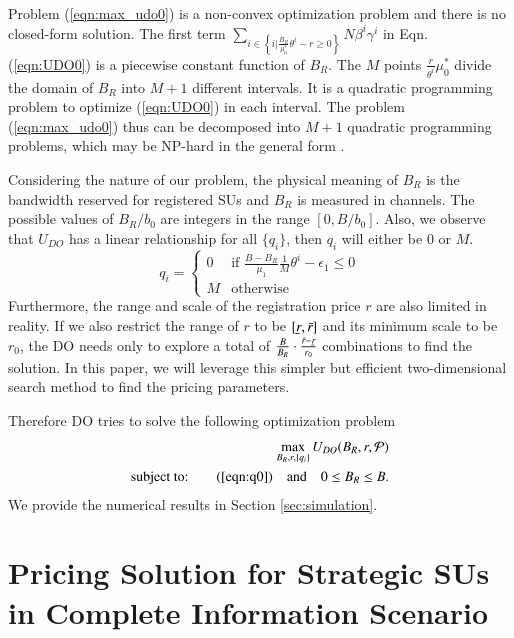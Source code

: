 \documentclass[journal]{IEEEtran}
\begin{document}
Problem (\ref{eqn:max_udo0}) is a non-convex optimization problem and there is no closed-form solution.
The first term $\sum_{i\in\left\{i|\frac{B_R}{\mu_0^*}\theta^i-r\geq 0\right\}}N\beta^i\gamma^i$ in Eqn. (\ref{eqn:UDO0}) is a piecewise constant function of $B_R$. The $M$ points $\frac{r}{\theta^{i}}\mu_0^*$ divide the domain of $B_R$ into $M+1$ different intervals. It is a quadratic programming problem to optimize (\ref{eqn:UDO0}) in each interval. The problem (\ref{eqn:max_udo0}) thus can be decomposed into $M+1$ quadratic programming problems, which may be NP-hard in the general form \cite{nonlinear}.

Considering the nature of our problem, the physical meaning of $B_R$ is the bandwidth reserved for registered SUs and $B_R$ is measured in channels. The possible values of $B_R/b_0$ are integers in the range $[0, B/b_0]$. Also, we observe that $U_{DO}$ has a linear relationship for all $\{q_i\}$, then $q_i$ will either be 0 or $M$.
\begin{equation}
\label{eqn:q0}
q_i=\left\{
\begin{array}{ll}
0 & \textrm{if $\frac{B-B_R}{\mu_1}\frac{1}{M}\theta^i-\epsilon_1\leq0$} \\
M & \textrm{otherwise}
\end{array}
\right.
\end{equation}
Furthermore, the range and scale of the registration price $r$ are also limited in reality. If we also restrict the range of $r$ to be $[\emph{\b{r}}, \emph{\={r}}]$ and its minimum scale to be $r_0$, the DO needs only to explore a total of $\frac{B}{B_R}\cdot\frac{\emph{\={r}}-\emph{\b{r}}}{r_0}$ combinations to find the solution.
In this paper, we will leverage this simpler but efficient two-dimensional search method to find the pricing parameters.

Therefore DO tries to solve the following optimization problem
\begin{eqnarray}
\label{eqn:max_udo1}
&&\max_{B_R, r, \{q_i\}} U_{DO}(B_R, r, \mathcal{P}) \nonumber\\
&\textrm{subject to:}& \quad (\ref{eqn:q0}) \quad\textrm{and}\quad 0\leq B_R\leq B.
\end{eqnarray}
We provide the numerical results in Section \ref{sec:simulation}.

\section{Pricing Solution for Strategic SUs in Complete Information Scenario}
\label{sec:strategic_complete}
\end{document}
